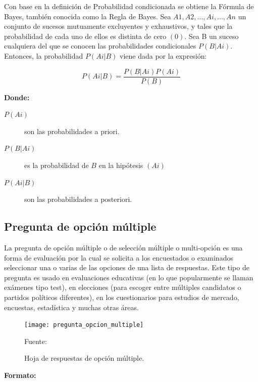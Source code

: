 Con base en la definición de Probabilidad condicionada \citep{bayes_formula} se obtiene la Fórmula de Bayes, también conocida como la Regla de Bayes.
\vskip 0.5cm 
Sea ${ A 1 , A 2 , . . . , A i , . . . , A n }$ un conjunto de sucesos mutuamente excluyentes y exhaustivos, y tales que la probabilidad de cada uno de ellos es distinta de cero $(0)$. Sea B un suceso cualquiera del que se conocen las probabilidades condicionales $P ( B | A i )$. Entonces, la probabilidad $P ( A i | B )$ viene dada por la expresión: 

\[ P ( A i | B )  = \frac{P ( B | A i ) P ( A i )} {P ( B )} \]

{\bf Donde:}\par

\begin{description}
	\item[$P ( A i )$] son las probabilidades a priori.
	\item[$P ( B | A i )$] es la probabilidad de $B$ en la hipótesis $( A i )$
	\item[$P ( A i | B )$] son las probabilidades a posteriori. 
\end{description}

\subsection{Pregunta de opción múltiple}

La pregunta de opción múltiple o de selección múltiple o multi-opción es una forma de evaluación por la cual se solicita a los encuestados o examinados seleccionar una o varias de las opciones de una lista de respuestas.
\vskip 1cm 
Este tipo de pregunta es usado en evaluaciones educativas (en lo que popularmente se llaman exámenes tipo test), en elecciones (para escoger entre múltiples candidatos o partidos políticos diferentes), en los cuestionarios para estudios de mercado, encuestas, estadística y muchas otras áreas.

\begin{figure}[ht]
	\begin{center}
		\texttt{[image: pregunta\_opcion\_multiple]}
	\end{center}
	\begin{center}
		\vskip -0.5cm
		\caption{\small{Hoja de respuestas de opción múltiple.}}
		{\small{Fuente: \citep{pregunta_opcion_multiple}}}
	\end{center}
\end{figure}
 
{\bf Formato:}\par

